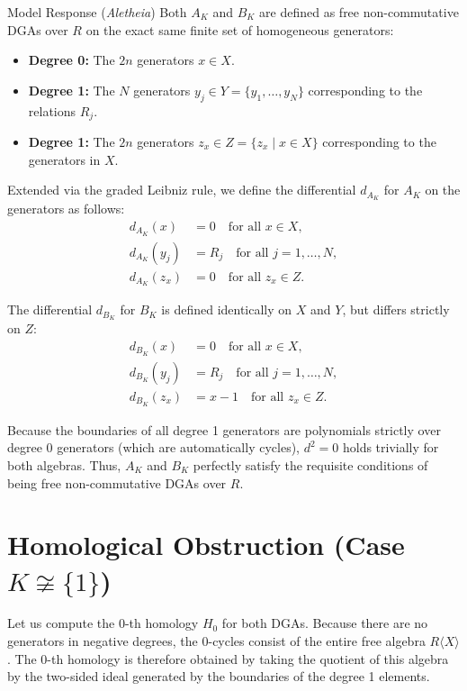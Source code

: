 \documentclass{article}
\theoremstyle{plain}
\theoremstyle{definition}
\newcommand{\Aletheia}{\emph{Aletheia}}
\begin{document}
\begin{solution}{Model Response (\Aletheia)}
Both $A_K$ and $B_K$ are defined as free non-commutative DGAs over $R$ on the exact same finite set of homogeneous generators:
\begin{itemize}
    \item \textbf{Degree 0:} The $2n$ generators $x \in X$.
    \item \textbf{Degree 1:} The $N$ generators $y_j \in Y = \{y_1, \dots, y_N\}$ corresponding to the relations $R_j$.
    \item \textbf{Degree 1:} The $2n$ generators $z_x \in Z = \{z_x \mid x \in X\}$ corresponding to the generators in $X$.
\end{itemize}

Extended via the graded Leibniz rule, we define the differential $d_{A_K}$ for $A_K$ on the generators as follows:
\begin{align*}
    d_{A_K}(x) &= 0 \quad \text{for all } x \in X, \\
    d_{A_K}(y_j) &= R_j \quad \text{for all } j = 1, \dots, N, \\
    d_{A_K}(z_x) &= 0 \quad \text{for all } z_x \in Z.
\end{align*}

The differential $d_{B_K}$ for $B_K$ is defined identically on $X$ and $Y$, but differs strictly on $Z$:
\begin{align*}
    d_{B_K}(x) &= 0 \quad \text{for all } x \in X, \\
    d_{B_K}(y_j) &= R_j \quad \text{for all } j = 1, \dots, N, \\
    d_{B_K}(z_x) &= x - 1 \quad \text{for all } z_x \in Z.
\end{align*}

Because the boundaries of all degree 1 generators are polynomials strictly over degree 0 generators (which are automatically cycles), $d^2 = 0$ holds trivially for both algebras. Thus, $A_K$ and $B_K$ perfectly satisfy the requisite conditions of being free non-commutative DGAs over $R$.

\section{Homological Obstruction (Case $K \not\cong \{1\}$)}

Let us compute the $0$-th homology $H_0$ for both DGAs. Because there are no generators in negative degrees, the $0$-cycles consist of the entire free algebra $R\langle X \rangle$. The $0$-th homology is therefore obtained by taking the quotient of this algebra by the two-sided ideal generated by the boundaries of the degree 1 elements.


\end{solution}
\end{document}
